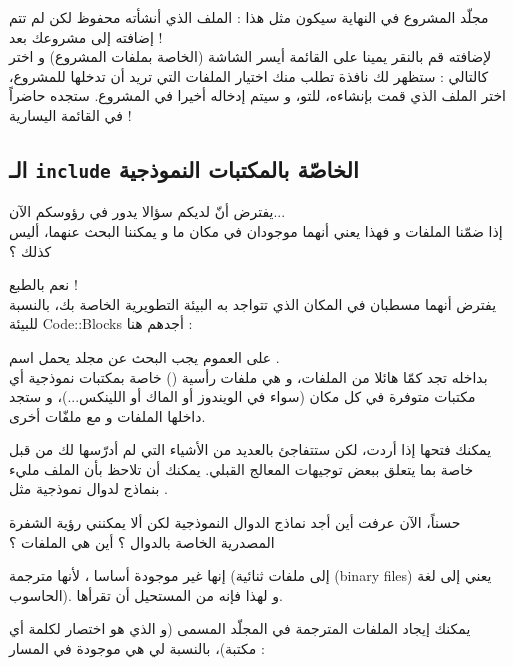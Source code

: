 مجلّد المشروع في النهاية سيكون مثل هذا :
الملف الذي أنشأته محفوظ لكن لم تتم إضافته إلى مشروعك بعد !\\
لإضافته قم بالنقر يمينا على القائمة أيسر الشاشة (الخاصة بملفات المشروع) و اختر
كالتالي :
ستظهر لك نافذة تطلب منك اختيار الملفات التي تريد أن تدخلها للمشروع، اختر الملف الذي قمت بإنشاءه، للتو، و سيتم إدخاله أخيرا في المشروع.  ستجده حاضراً في القائمة اليسارية !

\subsection{الـ
\texttt{include}
الخاصّة بالمكتبات النموذجية}
يفترض أنّ لديكم سؤالا يدور في رؤوسكم الآن...\\
إذا ضمّنا الملفات
و
فهذا يعني أنهما موجودان في مكان ما و يمكننا البحث عنهما، أليس كذلك ؟

نعم بالطبع !\\
يفترض أنهما مسطبان في المكان الذي تتواجد به البيئة التطويرية الخاصة بك، بالنسبة للبيئة
\textenglish{Code::Blocks}
أجدهم هنا :


على العموم يجب البحث عن مجلد يحمل اسم
.\\
بداخله تجد كمّا هائلا من الملفات، و هي ملفات رأسية
()
خاصة بمكتبات نموذجية أي مكتبات متوفرة في كل مكان (سواء في الويندوز أو الماك أو اللينكس...)، و ستجد داخلها الملفات
و
مع ملفّات أخرى.

يمكنك فتحها إذا أردت، لكن ستتفاجئ بالعديد من الأشياء التي لم أدرّسها لك من قبل خاصة بما يتعلق ببعض توجيهات المعالج القبلي. يمكنك أن تلاحظ بأن الملف مليء بنماذج لدوال نموذجية مثل
.
\begin{question}
  حسناً، الآن عرفت أين أجد نماذج الدوال النموذجية لكن ألا يمكنني رؤية الشفرة المصدرية الخاصة بالدوال ؟ أين هي الملفات
؟
\end{question}
إنها غير موجودة أساسا ، لأنها مترجمة (إلى ملفات ثنائية
(\textenglish{binary files})
يعني إلى لغة الحاسوب). و لهذا فإنه من المستحيل أن تقرأها.

يمكنك إيجاد الملفات المترجمة في المجلّد المسمى
(و الذي هو اختصار لكلمة
أي مكتبة)، بالنسبة لي هي موجودة في المسار :


